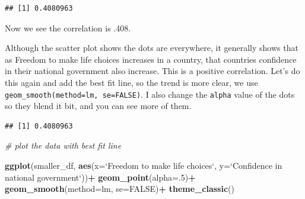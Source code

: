 \documentclass[]{book}
\newenvironment{Shaded}{\begin{snugshade}}{\end{snugshade}}
\newcommand{\KeywordTok}[1]{\textcolor[rgb]{0.13,0.29,0.53}{\textbf{#1}}}
\newcommand{\DataTypeTok}[1]{\textcolor[rgb]{0.13,0.29,0.53}{#1}}
\newcommand{\DecValTok}[1]{\textcolor[rgb]{0.00,0.00,0.81}{#1}}
\newcommand{\StringTok}[1]{\textcolor[rgb]{0.31,0.60,0.02}{#1}}
\newcommand{\CommentTok}[1]{\textcolor[rgb]{0.56,0.35,0.01}{\textit{#1}}}
\newcommand{\OtherTok}[1]{\textcolor[rgb]{0.56,0.35,0.01}{#1}}
\newcommand{\OperatorTok}[1]{\textcolor[rgb]{0.81,0.36,0.00}{\textbf{#1}}}
\newcommand{\NormalTok}[1]{#1}
\begin{document}
\begin{verbatim}
## [1] 0.4080963
\end{verbatim}

Now we see the correlation is .408.

Although the scatter plot shows the dots are everywhere, it generally
shows that as Freedom to make life choices increases in a country, that
countries confidence in their national government also increase. This is
a positive correlation. Let's do this again and add the best fit line,
so the trend is more clear, we use
\texttt{geom\_smooth(method=lm,\ se=FALSE)}. I also change the
\texttt{alpha} value of the dots so they blend it bit, and you can see
more of them.

\begin{Shaded}
\end{Shaded}

\begin{verbatim}
## [1] 0.4080963
\end{verbatim}

\begin{Shaded}
\begin{Highlighting}[]
\CommentTok{# plot the data with best fit line}

\KeywordTok{ggplot}\NormalTok{(smaller_df, }\KeywordTok{aes}\NormalTok{(}\DataTypeTok{x=}\StringTok{`}\DataTypeTok{Freedom to make life choices}\StringTok{`}\NormalTok{,}
                     \DataTypeTok{y=}\StringTok{`}\DataTypeTok{Confidence in national government}\StringTok{`}\NormalTok{))}\OperatorTok{+}
\StringTok{  }\KeywordTok{geom_point}\NormalTok{(}\DataTypeTok{alpha=}\NormalTok{.}\DecValTok{5}\NormalTok{)}\OperatorTok{+}
\StringTok{  }\KeywordTok{geom_smooth}\NormalTok{(}\DataTypeTok{method=}\NormalTok{lm, }\DataTypeTok{se=}\OtherTok{FALSE}\NormalTok{)}\OperatorTok{+}
\StringTok{  }\KeywordTok{theme_classic}\NormalTok{()}
\end{Highlighting}
\end{Shaded}
\end{document}
